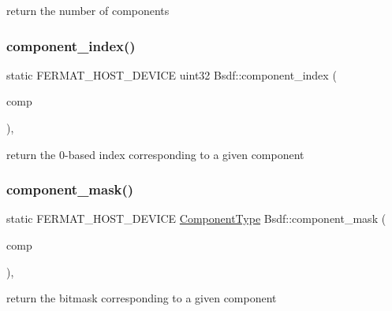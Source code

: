 return the number of components \mbox{\label{struct_bsdf_a0eccbf03af0e1d86cee1d7ebd1d5e752}} 
\subsubsection{\texorpdfstring{component\+\_\+index()}{component\_index()}}
{\footnotesize\ttfamily static F\+E\+R\+M\+A\+T\+\_\+\+H\+O\+S\+T\+\_\+\+D\+E\+V\+I\+CE uint32 Bsdf\+::component\+\_\+index (\begin{DoxyParamCaption}\item[{const \hyperlink{struct_bsdf_a5f7db6f81220ed9ee6da109d6eb5b585}{Component\+Type}}]{comp }\end{DoxyParamCaption})\hspace{0.3cm}{\ttfamily [inline]}, {\ttfamily [static]}}

return the 0-\/based index corresponding to a given component \mbox{\label{struct_bsdf_a6f95cfb6e2c6988cef49c8dcaefda5e6}} 
\subsubsection{\texorpdfstring{component\+\_\+mask()}{component\_mask()}}
{\footnotesize\ttfamily static F\+E\+R\+M\+A\+T\+\_\+\+H\+O\+S\+T\+\_\+\+D\+E\+V\+I\+CE \hyperlink{struct_bsdf_a5f7db6f81220ed9ee6da109d6eb5b585}{Component\+Type} Bsdf\+::component\+\_\+mask (\begin{DoxyParamCaption}\item[{const \hyperlink{struct_bsdf_acaa87fb810c0f7957db85bf41843f70c}{Component\+Index}}]{comp }\end{DoxyParamCaption})\hspace{0.3cm}{\ttfamily [inline]}, {\ttfamily [static]}}

return the bitmask corresponding to a given component \mbox{\label{struct_bsdf_a474750a7281cd4945bc40ca5c9ea3ffd}} 
